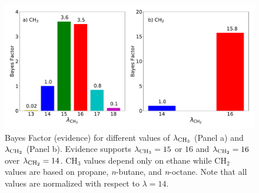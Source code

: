 \documentclass[preprint,letterpaper,floatfix,citeautoscript,aip,jcp]{revtex4-1}
\begin{document}



\begin{figure}[htb!]
	\centering
	\includegraphics[width=4.8in]{Evidence_Mie_CH3_CH2}
	\caption{Bayes Factor (evidence) for different values of $\lambda_{\rm CH_3}$ (Panel a) and $\lambda_{\rm CH_2}$ (Panel b). Evidence supports $\lambda_{\rm CH_3} =15 $ or $16$ and $\lambda_{\rm CH_2} = 16$ over $\lambda_{\rm CH_2} = 14$. CH$_3$ values depend only on ethane while CH$_2$ values are based on propane, \textit{n}-butane, and \textit{n}-octane. Note that all values are normalized with respect to $\lambda = 14$.}
	\label{fig:Bayes_Factors}
\end{figure}
\end{document}
